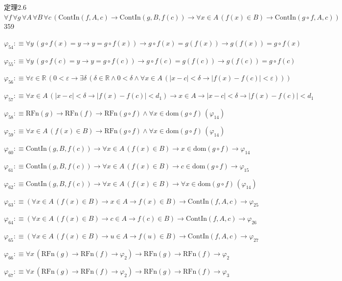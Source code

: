 \begin{fullproof}{定理2.6}{$\forall f\,\forall g\,\forall A\,\forall B\,\forall c\,(\mathrm{ContIn}(f,A,c) \to \mathrm{ContIn}(g,B,f(c)) \to \forall x \in A\,(f(x) \in B) \to \mathrm{ContIn}(g \circ f,A,c))$}{359}
\begin{abbrevlist}
\item $\varphi_{54} :\equiv \forall y\,(g \circ f(x) = y \to y = g \circ f(x)) \to g \circ f(x) = g(f(x)) \to g(f(x)) = g \circ f(x)$
\item $\varphi_{55} :\equiv \forall y\,(g \circ f(c) = y \to y = g \circ f(c)) \to g \circ f(c) = g(f(c)) \to g(f(c)) = g \circ f(c)$
\item $\varphi_{56} :\equiv \forall \varepsilon \in \mathbb{R}\,(0 < \varepsilon \to \exists \delta\,(\delta \in \mathbb{R} \land 0 < \delta \land \forall x \in A\,(\lvert x - c \rvert < \delta \to \lvert f(x) - f(c) \rvert < \varepsilon)))$
\item $\varphi_{57} :\equiv \forall x \in A\,(\lvert x - c \rvert < \delta \to \lvert f(x) - f(c) \rvert < d_{1}) \to x \in A \to \lvert x - c \rvert < \delta \to \lvert f(x) - f(c) \rvert < d_{1}$
\item $\varphi_{58} :\equiv \mathrm{RFn}(g) \to \mathrm{RFn}(f) \to \mathrm{RFn}(g \circ f) \land \forall x \in \mathrm{dom}(g \circ f)\,(\varphi_{14})$
\item $\varphi_{59} :\equiv \forall x \in A\,(f(x) \in B) \to \mathrm{RFn}(g \circ f) \land \forall x \in \mathrm{dom}(g \circ f)\,(\varphi_{14})$
\item $\varphi_{60} :\equiv \mathrm{ContIn}(g,B,f(c)) \to \forall x \in A\,(f(x) \in B) \to x \in \mathrm{dom}(g \circ f) \to \varphi_{14}$
\item $\varphi_{61} :\equiv \mathrm{ContIn}(g,B,f(c)) \to \forall x \in A\,(f(x) \in B) \to c \in \mathrm{dom}(g \circ f) \to \varphi_{15}$
\item $\varphi_{62} :\equiv \mathrm{ContIn}(g,B,f(c)) \to \forall x \in A\,(f(x) \in B) \to \forall x \in \mathrm{dom}(g \circ f)\,(\varphi_{14})$
\item $\varphi_{63} :\equiv (\forall x \in A\,(f(x) \in B) \to x \in A \to f(x) \in B) \to \mathrm{ContIn}(f,A,c) \to \varphi_{25}$
\item $\varphi_{64} :\equiv (\forall x \in A\,(f(x) \in B) \to c \in A \to f(c) \in B) \to \mathrm{ContIn}(f,A,c) \to \varphi_{26}$
\item $\varphi_{65} :\equiv (\forall x \in A\,(f(x) \in B) \to u \in A \to f(u) \in B) \to \mathrm{ContIn}(f,A,c) \to \varphi_{27}$
\item $\varphi_{66} :\equiv \forall x\,(\mathrm{RFn}(g) \to \mathrm{RFn}(f) \to \varphi_{2}) \to \mathrm{RFn}(g) \to \mathrm{RFn}(f) \to \varphi_{2}$
\item $\varphi_{67} :\equiv \forall x\,(\mathrm{RFn}(g) \to \mathrm{RFn}(f) \to \varphi_{2}) \to \mathrm{RFn}(g) \to \mathrm{RFn}(f) \to \varphi_{3}$

\end{abbrevlist}
\end{fullproof}
